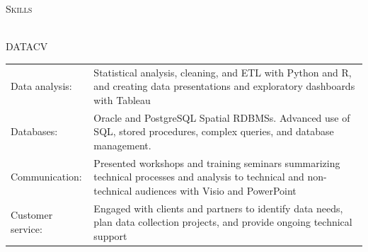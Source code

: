 \documentclass[letterpaper]{article}
\newcommand{\lineunder} {
        \vspace*{-8pt} \\
        \hspace*{-18pt} \hrulefill \\
    }
\newcommand{\header} [1] {
        \vspace{10pt}
        {\hspace*{-18pt}\vspace*{6pt} \textsc{#1}}
        \vspace*{-6pt} \lineunder
        \vspace{3pt}
    }
\newenvironment{skillslist}
        {
            \begin{tabular}[t]{ l L{5.17in} }
        }{
            \end{tabular}
        }
\begin{document}
\header{Skills}
    \begin{taggedblock}{DATACV}
        \begin{skillslist}
            Data analysis: &
                Statistical analysis, cleaning, and ETL with Python and R, 
                and creating data presentations and exploratory dashboards with
                Tableau
                \\
            Databases: & 
                Oracle and PostgreSQL Spatial RDBMSs. Advanced use of SQL, stored
                procedures, complex queries, and database management.
                \\
            Communication: &
                Presented workshops and training seminars summarizing technical
                processes and analysis to technical and non-technical audiences
                with Visio and PowerPoint
                \\
            Customer service: &
                Engaged with clients and partners to identify data needs, plan data
                collection projects, and provide ongoing technical support
                \\
        \end{skillslist}
    \end{taggedblock}
\end{document}

